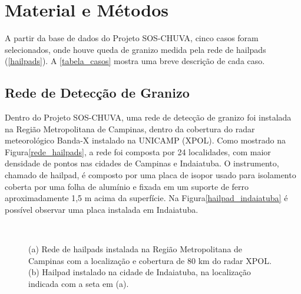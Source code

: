 \chapter{Material e Métodos}\label{database}

A partir da base de dados do Projeto SOS-CHUVA, cinco casos foram selecionados, onde houve queda de granizo medida pela rede de hailpads (\autoref{hailpads}). A \autoref{tabela_casos} mostra uma breve descrição de cada caso.



\section{Rede de Detecção de Granizo}\label{hailpads}

Dentro do Projeto SOS-CHUVA, uma rede de detecção de granizo foi instalada na Região Metropolitana de Campinas, dentro da cobertura do radar meteorológico Banda-X instalado na UNICAMP (XPOL). Como mostrado na Figura\autoref{rede_hailpads}, a rede foi composta por 24 localidades, com maior densidade de pontos nas cidades de Campinas e Indaiatuba. O instrumento, chamado de hailpad, é composto por uma placa de isopor usado para isolamento coberta por uma folha de alumínio e fixada em um suporte de ferro aproximadamente 1,5 m acima da superfície. Na Figura\autoref{hailpad_indaiatuba} é possível observar uma placa instalada em Indaiatuba.

\begin{figure}[htb]
	\begin{center}
		\caption{(a) Rede de hailpads instalada na Região Metropolitana de Campinas com a localização e cobertura de 80 km do radar XPOL. (b) Hailpad instalado na cidade de Indaiatuba, na localização indicada com a seta em (a).} 
		\label{overview_hailpads}
		\ \
		\\
	\end{center}
\end{figure}

